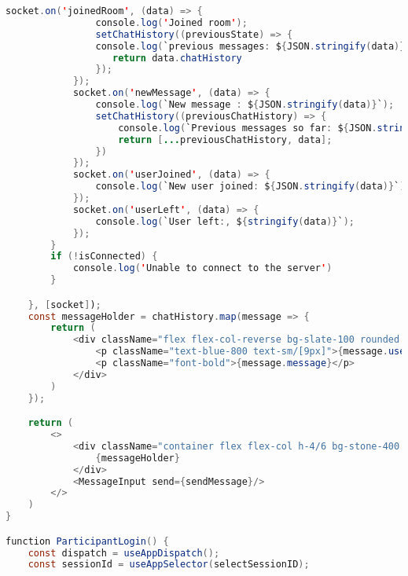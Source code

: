 \begin{lstlisting}[language=Java, caption={Chat Page Component}, label={lst:java}]
            socket.on('joinedRoom', (data) => {
                console.log('Joined room');
                setChatHistory((previousState) => {
                console.log(`previous messages: ${JSON.stringify(data)}`)
                   return data.chatHistory
                });
            });
            socket.on('newMessage', (data) => {
                console.log(`New message : ${JSON.stringify(data)}`);
                setChatHistory((previousChatHistory) => {
                    console.log(`Previous messages so far: ${JSON.stringify(previousChatHistory)}`);
                    return [...previousChatHistory, data];
                })
            });
            socket.on('userJoined', (data) => {
                console.log(`New user joined: ${JSON.stringify(data)}`)
            });
            socket.on('userLeft', (data) => {
                console.log(`User left:, ${stringify(data)}`);
            });
        }
        if (!isConnected) {
            console.log('Unable to connect to the server')
        }

    }, [socket]);
    const messageHolder = chatHistory.map(message => {
        return (
            <div className="flex flex-col-reverse bg-slate-100 rounded m-1 p-2">
                <p className="text-blue-800 text-sm/[9px]">{message.username}</p>
                <p className="font-bold">{message.message}</p>
            </div>
        )
    });

    return (
        <>
            <div className="container flex flex-col h-4/6 bg-stone-400 rounded p-2 justify-center">
                {messageHolder}
            </div>
            <MessageInput send={sendMessage}/>
        </>
    )
}

function ParticipantLogin() {
    const dispatch = useAppDispatch();
    const sessionId = useAppSelector(selectSessionID);


\end{lstlisting}
